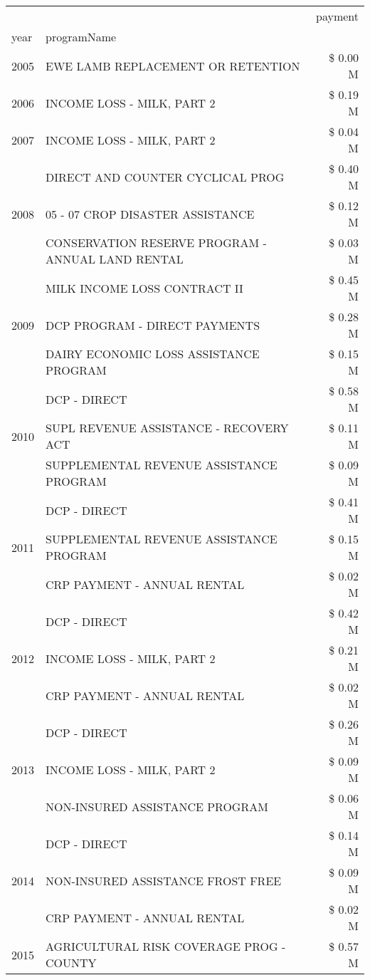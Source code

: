 \begin{tabular}{llr}
\toprule
 &  & payment \\
year & programName &  \\
\midrule
2005 & EWE LAMB REPLACEMENT OR RETENTION & \$ 0.00 M \\
\cline{1-3}
2006 & INCOME LOSS - MILK, PART 2 & \$ 0.19 M \\
\cline{1-3}
2007 & INCOME LOSS - MILK, PART 2 & \$ 0.04 M \\
\cline{1-3}
\multirow[t]{3}{*}{2008} & DIRECT AND COUNTER CYCLICAL PROG & \$ 0.40 M \\
 & 05 - 07 CROP DISASTER ASSISTANCE & \$ 0.12 M \\
 & CONSERVATION RESERVE PROGRAM - ANNUAL LAND RENTAL & \$ 0.03 M \\
\cline{1-3}
\multirow[t]{3}{*}{2009} & MILK INCOME LOSS CONTRACT II & \$ 0.45 M \\
 & DCP PROGRAM - DIRECT PAYMENTS & \$ 0.28 M \\
 & DAIRY ECONOMIC LOSS ASSISTANCE PROGRAM & \$ 0.15 M \\
\cline{1-3}
\multirow[t]{3}{*}{2010} & DCP - DIRECT & \$ 0.58 M \\
 & SUPL REVENUE ASSISTANCE - RECOVERY ACT & \$ 0.11 M \\
 & SUPPLEMENTAL REVENUE ASSISTANCE PROGRAM & \$ 0.09 M \\
\cline{1-3}
\multirow[t]{3}{*}{2011} & DCP - DIRECT & \$ 0.41 M \\
 & SUPPLEMENTAL REVENUE ASSISTANCE PROGRAM & \$ 0.15 M \\
 & CRP PAYMENT - ANNUAL RENTAL & \$ 0.02 M \\
\cline{1-3}
\multirow[t]{3}{*}{2012} & DCP - DIRECT & \$ 0.42 M \\
 & INCOME LOSS - MILK, PART 2 & \$ 0.21 M \\
 & CRP PAYMENT - ANNUAL RENTAL & \$ 0.02 M \\
\cline{1-3}
\multirow[t]{3}{*}{2013} & DCP - DIRECT & \$ 0.26 M \\
 & INCOME LOSS - MILK, PART 2 & \$ 0.09 M \\
 & NON-INSURED ASSISTANCE PROGRAM & \$ 0.06 M \\
\cline{1-3}
\multirow[t]{3}{*}{2014} & DCP - DIRECT & \$ 0.14 M \\
 & NON-INSURED ASSISTANCE FROST FREE & \$ 0.09 M \\
 & CRP PAYMENT - ANNUAL RENTAL & \$ 0.02 M \\
\cline{1-3}
\multirow[t]{3}{*}{2015} & AGRICULTURAL RISK COVERAGE PROG - COUNTY & \$ 0.57 M \\

\end{tabular}
